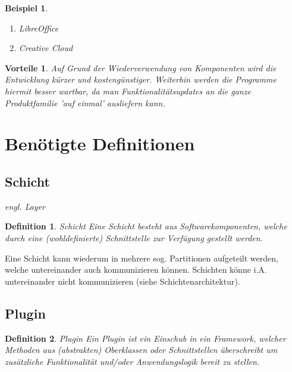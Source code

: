 \documentclass[a4paper]{article}
\theoremstyle{break}
\newtheorem{defi}{Definition}[section]
\newtheorem{ex}{Beispiel}[section]
\newtheorem{why}{Vorteile}[section]
\begin{document}
\begin{ex}
	\begin{enumerate}
		\item LibreOffice
		\item Creative Cloud
	\end{enumerate}
\end{ex}

\begin{why}
	Auf Grund der Wiederverwendung von Komponenten wird die Entwicklung kürzer und kostengünstiger. Weiterhin werden die Programme hiermit besser wartbar, da man Funktionalitätsupdates an die ganze Produktfamilie 'auf einmal' ausliefern kann.
\end{why}
\newpage
\section{Benötigte Definitionen}
\subsection{Schicht}

\textit{engl. Layer}
\begin{defi}{Schicht}
	Eine Schicht besteht aus Softwarekomponenten, welche durch eine (wohldefinierte) Schnittstelle zur Verfügung gestellt werden.
\end{defi}

Eine Schicht kann wiederum in mehrere sog. Partitionen aufgeteilt werden, welche untereinander auch kommunizieren können. Schichten könne i.A. untereinander nicht kommunizieren (siehe Schichtenarchitektur).

\subsection{Plugin}
\begin{defi}{Plugin}
	Ein Plugin ist ein Einschub in ein Framework, welcher Methoden aus (abstrakten) Oberklassen oder Schnittstellen überschreibt um zusätzliche Funktionalität und/oder Anwendungslogik bereit zu stellen.
\end{defi}
\end{document}

